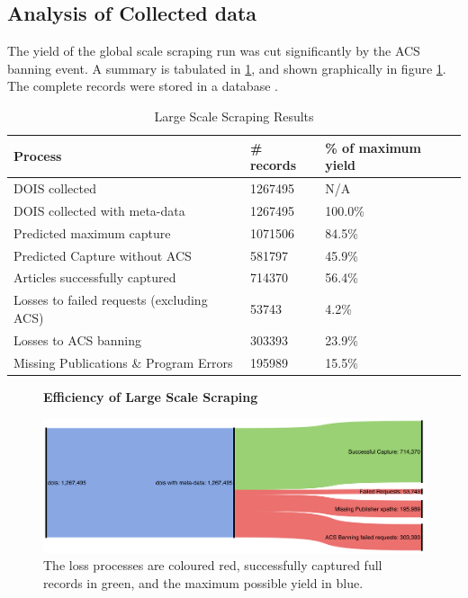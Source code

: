 \subsection{Analysis of Collected data}
The yield of the global scale scraping run was cut significantly by the ACS banning event. A summary is tabulated in \ref{tab:LARGESCRAPERES}, and shown graphically in figure \ref{fig:LARGESANK}. The complete records were stored in a database .
\begin{table}[h!]
\caption{Large Scale Scraping Results}
\label{tab:LARGESCRAPERES}

\begin{center}
\begin{tabular}{||l|l|l||}
\hline
Process & \# records & \% of maximum yield\\
\hline
DOIS collected &  1267495 &N/A\\
DOIS collected with meta-data &  1267495 &100.0\%\\

\hline
Predicted maximum capture & 1071506 &  84.5\%\\
Predicted Capture without ACS & 581797 & 45.9\%\\
\hline
Articles successfully captured & 714370 & 56.4\%\\
Losses to failed requests (excluding ACS)& 53743 & 4.2\%\\
Losses to ACS banning & 303393 & 23.9\%\\
Missing Publications \& Program Errors & 195989 & 15.5\%\\
\hline
\end{tabular}
\end{center}
\end{table}
\begin{figure}[H]
    \centering
    \textbf{Efficiency of Large Scale Scraping}\par\medskip
    \includegraphics[width=\textwidth]{Data_Acquisition/large_sankey.png}
    \caption[Efficiency of Large Scale Scraping]{The loss processes are coloured red, successfully captured full records in green, and the maximum possible yield in blue.}
     \label{fig:LARGESANK}
\end{figure}


